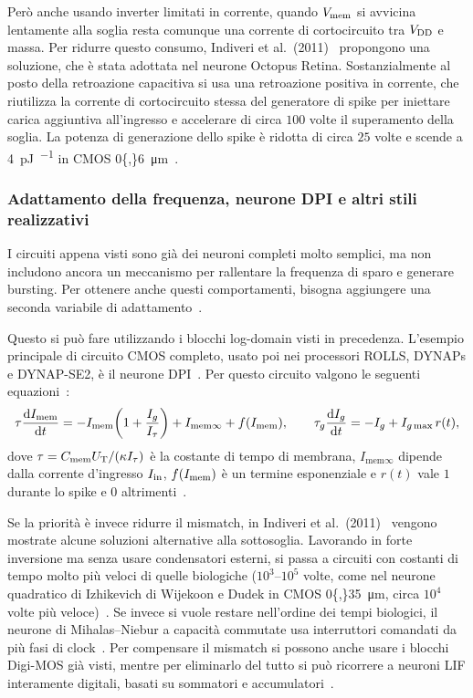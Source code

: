 Però anche usando inverter limitati in corrente, quando $V_{\mathrm{mem}}$ si avvicina lentamente alla soglia resta comunque una corrente di cortocircuito tra $V_{\mathrm{DD}}$ e massa. Per ridurre questo consumo, Indiveri et al.\ (2011)~\cite{indiveri2011} propongono una soluzione, che è stata adottata nel neurone Octopus Retina. Sostanzialmente al posto della retroazione capacitiva si usa una retroazione positiva in corrente, che riutilizza la corrente di cortocircuito stessa del generatore di spike per iniettare carica aggiuntiva all'ingresso e accelerare di circa $100$ volte il superamento della soglia. La potenza di generazione dello spike è ridotta di circa $25$ volte e scende a \SI{4}{\pico\joule\per\spike} in CMOS \SI{0{,}6}{\micro\meter}~\cite{indiveri2011}.

\subsubsection{Adattamento della frequenza, neurone DPI e altri stili realizzativi}
\label{subsec:famiglie_neuroni}

I circuiti appena visti sono già dei neuroni completi molto semplici, ma non includono ancora un meccanismo per rallentare la frequenza di sparo e generare bursting. Per ottenere anche questi comportamenti, bisogna aggiungere una seconda variabile di adattamento~\cite{indiveri2011}.

Questo si può fare utilizzando i blocchi log-domain visti in precedenza. L'esempio principale di circuito CMOS completo, usato poi nei processori ROLLS, DYNAPs e DYNAP-SE2, è il neurone DPI~\cite{indiveri2011, qiao2015, moradi2018, bartels2025}. Per questo circuito valgono le seguenti equazioni~\cite{indiveri2011}:
\begin{equation}
  \tau \frac{\mathrm{d}I_{\mathrm{mem}}}{\mathrm{d}t} = -I_{\mathrm{mem}}\!\left(1 + \frac{I_g}{I_\tau}\right) + I_{\mathrm{mem}\infty} + f(I_{\mathrm{mem}}),
  \qquad
  \tau_g \frac{\mathrm{d}I_g}{\mathrm{d}t} = -I_g + I_{g\max}\,r(t),
  \label{eq:dpi_adex}
\end{equation}
dove $\tau = C_{\mathrm{mem}}U_{\mathrm{T}}/(\kappa I_\tau)$ è la costante di tempo di membrana, $I_{\mathrm{mem}\infty}$ dipende dalla corrente d'ingresso $I_{\mathrm{in}}$, $f(I_{\mathrm{mem}})$ è un termine esponenziale e $r(t)$ vale $1$ durante lo spike e $0$ altrimenti~\cite{indiveri2011}.

Se la priorità è invece ridurre il mismatch, in Indiveri et al.\ (2011)~\cite{indiveri2011} vengono mostrate alcune soluzioni alternative alla sottosoglia. Lavorando in forte inversione ma senza usare condensatori esterni, si passa a circuiti con costanti di tempo molto più veloci di quelle biologiche ($10^3\text{--}10^5$ volte, come nel neurone quadratico di Izhikevich di Wijekoon e Dudek in CMOS \SI{0{,}35}{\micro\meter}, circa $10^4$ volte più veloce)~\cite{indiveri2011}. Se invece si vuole restare nell'ordine dei tempi biologici, il neurone di Mihalas--Niebur a capacità commutate usa interruttori comandati da più fasi di clock~\cite{indiveri2011}. Per compensare il mismatch si possono anche usare i blocchi Digi-MOS già visti, mentre per eliminarlo del tutto si può ricorrere a neuroni LIF interamente digitali, basati su sommatori e accumulatori~\cite{indiveri2011}.

